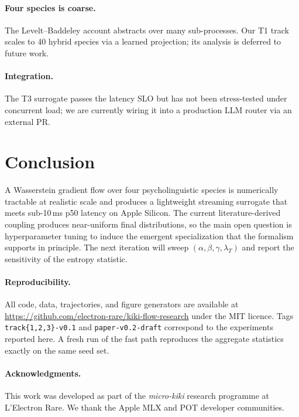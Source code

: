 \documentclass[11pt]{article}
\begin{document}
\paragraph{Four species is coarse.} The Levelt--Baddeley account abstracts
over many sub-processes. Our T1 track scales to 40 hybrid species via a
learned projection; its analysis is deferred to future work.

\paragraph{Integration.} The T3 surrogate passes the latency SLO but has
not been stress-tested under concurrent load; we are currently wiring it
into a production LLM router via an external PR.

\section{Conclusion}
\label{sec:conclusion}

A Wasserstein gradient flow over four psycholinguistic species is
numerically tractable at realistic scale and produces a lightweight
streaming surrogate that meets sub-10\,ms p50 latency on Apple Silicon.
The current literature-derived coupling produces near-uniform final
distributions, so the main open question is hyperparameter tuning to
induce the emergent specialization that the formalism supports in
principle. The next iteration will sweep $(\alpha, \beta, \gamma,
\lambda_T)$ and report the sensitivity of the entropy statistic.

\paragraph{Reproducibility.}
All code, data, trajectories, and figure generators are available at
\url{https://github.com/electron-rare/kiki-flow-research} under the MIT
licence. Tags \texttt{track\{1,2,3\}-v0.1} and \texttt{paper-v0.2-draft}
correspond to the experiments reported here. A fresh run of the fast
path reproduces the aggregate statistics exactly on the same seed set.

\paragraph{Acknowledgments.}
This work was developed as part of the \emph{micro-kiki} research
programme at L'Electron Rare. We thank the Apple MLX and POT developer
communities.



\end{document}
